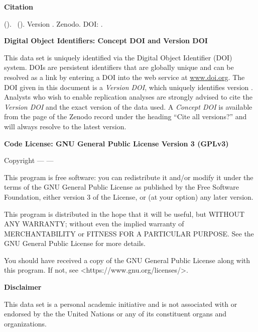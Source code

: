 \textbf{Citation}

\emph{\projectauthor} (\the\year ). \softwaretitle\ (\softwareshort ). Version \version . Zenodo. DOI: \softwareversiondoi .

\vspace{0.5cm}

\textbf{Digital Object Identifiers: Concept DOI and Version DOI}

This data set is uniquely identified via the Digital Object Identifier (DOI) system. DOIs are persistent identifiers that are globally unique and can be resolved as a link by entering a DOI into the web service at \url{www.doi.org}. The DOI given in this document is a \emph{Version DOI}, which uniquely identifies version \version. Analysts who wish to enable replication analyses are strongly advised to cite the \emph{Version DOI} and the exact version of the data used. A \emph{Concept DOI} is available from the page of the Zenodo record under the heading \enquote{Cite all versions?} and will always resolve to the latest version.

\vspace{0.5cm}



\textbf{Code License: GNU General Public License Version 3 (GPLv3)}

Copyright --- \the\year --- \dataauthor

This program is free software: you can redistribute it and/or modify it under the terms of the GNU General Public License as published by the Free Software Foundation, either version 3 of the License, or (at your option) any later version.

This program is distributed in the hope that it will be useful, but WITHOUT ANY WARRANTY; without even the implied warranty of MERCHANTABILITY or FITNESS FOR A PARTICULAR PURPOSE.  See the GNU General Public License for more details.

You should have received a copy of the GNU General Public License along with this program.  If not, see <https://www.gnu.org/licenses/>.

\vspace{0.5cm}

\textbf{Disclaimer} 

This data set is a personal academic initiative and is not associated with or endorsed by the the United Nations or any of its constituent organs and organizations.


\newpage